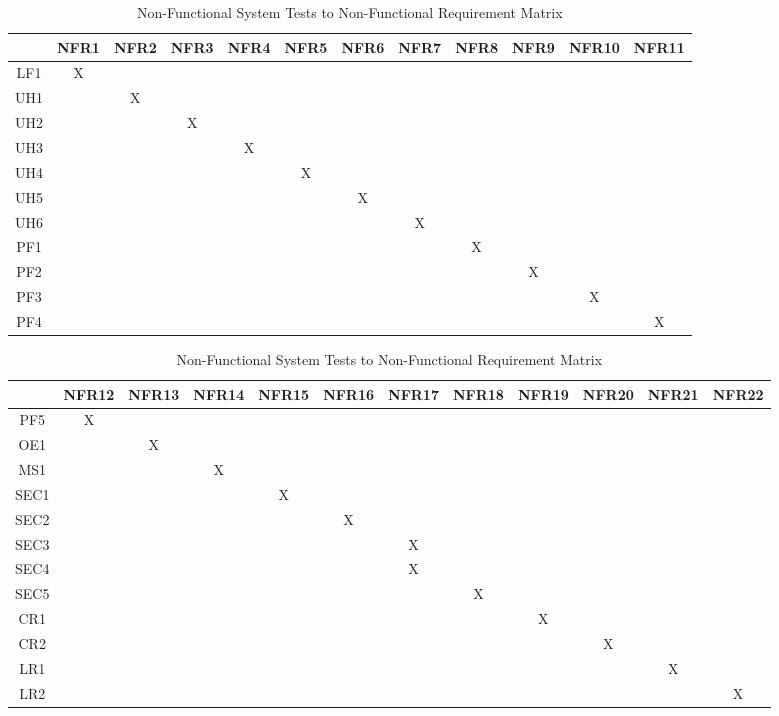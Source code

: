 \documentclass[12pt, titlepage]{article}
\begin{document}
\begin{table}[H]
	\begin{adjustwidth}{-3cm}{-5cm}
		\begin{tabular}{|c|c|c|c|c|c|c|c|c|c|c|c|}
			\hline
			& NFR1 & NFR2 & NFR3 & NFR4 & NFR5 & NFR6 & NFR7 & NFR8 & NFR9 & NFR10 & NFR11 \\ \hline
			LF1 &X & & & & & & & & & & \\ \hline
			UH1 & &X & & & & & & & & & \\ \hline
			UH2 & & &X & & & & & & & & \\ \hline
			UH3 & & & &X & & & & & & & \\ \hline 
			UH4 & & & & &X & & & & & & \\ \hline 
			UH5 & & & & & &X & & & & & \\ \hline 
			UH6 & & & & & & &X & & & & \\ \hline 
			PF1 & & & & & & & &X & & & \\ \hline 
			PF2 & & & & & & & & &X & & \\ \hline 
			PF3 & & & & & & & & & &X & \\ \hline
			PF4 & & & & & & & & & & &X \\ \hline  
		\end{tabular}
		\caption{Non-Functional System Tests to Non-Functional Requirement Matrix}
		\label{Table:R_trace}
		
		\begin{tabular}{|c|c|c|c|c|c|c|c|c|c|c|c|}
			\hline
			& NFR12 & NFR13 & NFR14 & NFR15 & NFR16 & NFR17 & NFR18 & NFR19 & NFR20 & NFR21 & NFR22 \\ \hline
			PF5 &X & & & & & & & & & & \\ \hline
			OE1 & &X & & & & & & & & & \\ \hline
			MS1 & & &X & & & & & & & & \\ \hline
			SEC1 & & & &X & & & & & & & \\ \hline 
			SEC2 & & & & &X & & & & & & \\ \hline 
			SEC3 & & & & & &X & & & & & \\ \hline 
			SEC4 & & & & & &X & & & & & \\ \hline 
			SEC5 & & & & & & &X & & & & \\ \hline 
			CR1 & & & & & & & &X & & & \\ \hline 
			CR2 & & & & & & & & &X & & \\ \hline 
			LR1 & & & & & & & & & &X & \\ \hline 
			LR2 & & & & & & & & & & &X \\ \hline 
		\end{tabular}
		\caption{Non-Functional System Tests to Non-Functional Requirement Matrix}
		\label{Table:R_trace}
	\end{adjustwidth}
\end{table}
\end{document}
